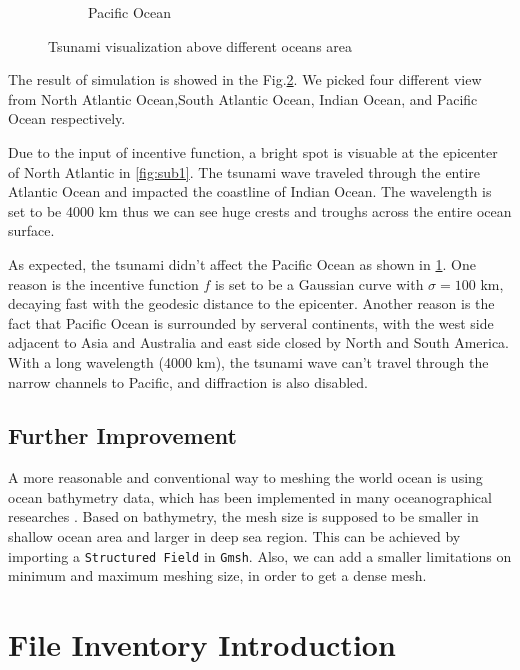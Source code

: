 \documentclass[a4paper]{article}
\begin{document}
\begin{figure}
\begin{subfigure}[b]{0.475\textwidth}
        \caption[]%
        {{\small Pacific Ocean}}    
        \label{fig:sub4}
    \end{subfigure}
    \caption[ The average and standard deviation of critical parameters ]
    {\small Tsunami visualization above different oceans area} 
    \label{fig:result_view}
\end{figure}


The result of simulation is showed in the Fig.\ref{fig:result_view}. We picked four 
different view from North Atlantic Ocean,South Atlantic Ocean, Indian Ocean, and Pacific Ocean
respectively.

Due to the input of incentive function, a bright spot 
is visuable at the epicenter of North Atlantic in \ref{fig:sub1}. The tsunami wave traveled through the
entire Atlantic Ocean and impacted the coastline of Indian Ocean.
The wavelength is set to be 4000 km thus we can see huge crests and 
troughs across the entire ocean surface.

As expected, the tsunami didn't affect the Pacific Ocean as shown in \ref{fig:sub4}. One reason is the incentive
function $f$ is set to be a Gaussian curve with $\sigma=100$ km, decaying fast with the geodesic distance to the epicenter.
Another reason is the fact that Pacific Ocean is surrounded by serveral continents, with the 
west side adjacent to Asia and Australia and east side closed by North and South America. 
With a long wavelength (4000 km), the tsunami wave can't travel through the narrow channels to Pacific,
and diffraction is also disabled.



\subsection{Further Improvement}
A more reasonable and conventional way to meshing the world ocean is using ocean bathymetry data\cite{amante2009etopo1}, which 
has been implemented in many oceanographical researches \cite{legrand2006high}. 
Based on bathymetry, the mesh size is supposed to be smaller in shallow ocean area and larger in deep sea region.
This can be achieved by importing a \verb|Structured Field| in \verb|Gmsh|.
Also, we can add a smaller limitations on minimum and maximum meshing size, in order to get a dense mesh.




\newpage



\newpage
\appendix
\section{File Inventory Introduction}
\end{document}
